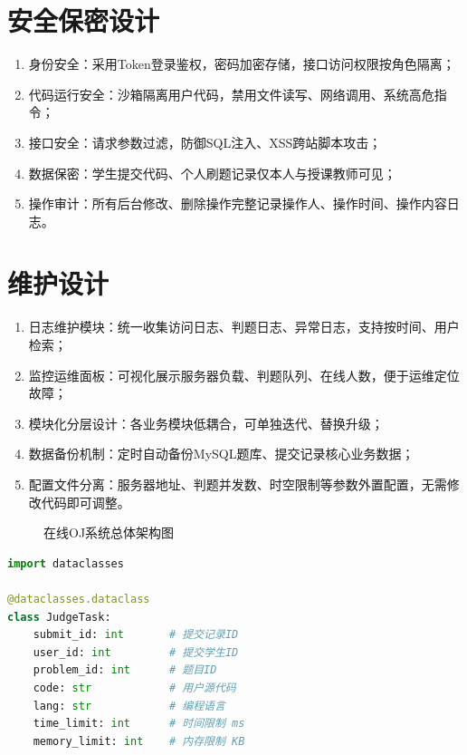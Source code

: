 \documentclass{../template/softeng}
\begin{document}
\section{安全保密设计}
\begin{enumerate}
    \item 身份安全：采用Token登录鉴权，密码加密存储，接口访问权限按角色隔离；
    \item 代码运行安全：沙箱隔离用户代码，禁用文件读写、网络调用、系统高危指令；
    \item 接口安全：请求参数过滤，防御SQL注入、XSS跨站脚本攻击；
    \item 数据保密：学生提交代码、个人刷题记录仅本人与授课教师可见；
    \item 操作审计：所有后台修改、删除操作完整记录操作人、操作时间、操作内容日志。
\end{enumerate}

\section{维护设计}
\begin{enumerate}
    \item 日志维护模块：统一收集访问日志、判题日志、异常日志，支持按时间、用户检索；
    \item 监控运维面板：可视化展示服务器负载、判题队列、在线人数，便于运维定位故障；
    \item 模块化分层设计：各业务模块低耦合，可单独迭代、替换升级；
    \item 数据备份机制：定时自动备份MySQL题库、提交记录核心业务数据；
    \item 配置文件分离：服务器地址、判题并发数、时空限制等参数外置配置，无需修改代码即可调整。
\end{enumerate}

\begin{figure}[htbp]
    \centering
    \caption{在线OJ系统总体架构图}
\end{figure}

\begin{lstlisting}[language=Python]
import dataclasses

@dataclasses.dataclass
class JudgeTask:
    submit_id: int       # 提交记录ID
    user_id: int         # 提交学生ID
    problem_id: int      # 题目ID
    code: str            # 用户源代码
    lang: str            # 编程语言
    time_limit: int      # 时间限制 ms
    memory_limit: int    # 内存限制 KB
\end{lstlisting}
\end{document}
